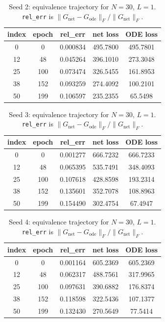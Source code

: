 \begin{table}[H]
\centering
\caption{Seed 2: equivalence trajectory for $N=30$, $L=1$. \texttt{rel\_err} is $\|G_{\mathrm{net}} - G_{\mathrm{ode}}\|_F / \|G_{\mathrm{net}}\|_F$.}
\label{tab:equiv-N30-L1-s2}
\begin{tabular}{c c c c c}
\toprule
index & epoch & rel\_err & net loss & ODE loss \\
\midrule
0 & 0 & 0.000834 & 495.7800 & 495.7801 \\
12 & 48 & 0.045264 & 396.1010 & 273.3048 \\
25 & 100 & 0.073474 & 326.5455 & 161.8953 \\
38 & 152 & 0.093259 & 274.4092 & 100.2101 \\
50 & 199 & 0.106597 & 235.2355 & 65.5498 \\
\bottomrule
\end{tabular}
\end{table}

\begin{table}[H]
\centering
\caption{Seed 3: equivalence trajectory for $N=30$, $L=1$. \texttt{rel\_err} is $\|G_{\mathrm{net}} - G_{\mathrm{ode}}\|_F / \|G_{\mathrm{net}}\|_F$.}
\label{tab:equiv-N30-L1-s3}
\begin{tabular}{c c c c c}
\toprule
index & epoch & rel\_err & net loss & ODE loss \\
\midrule
0 & 0 & 0.001277 & 666.7232 & 666.7233 \\
12 & 48 & 0.065395 & 535.7491 & 348.4093 \\
25 & 100 & 0.107618 & 428.8598 & 193.2314 \\
38 & 152 & 0.135601 & 352.7078 & 108.8963 \\
50 & 199 & 0.154490 & 302.4754 & 67.4947 \\
\bottomrule
\end{tabular}
\end{table}

\begin{table}[H]
\centering
\caption{Seed 4: equivalence trajectory for $N=30$, $L=1$. \texttt{rel\_err} is $\|G_{\mathrm{net}} - G_{\mathrm{ode}}\|_F / \|G_{\mathrm{net}}\|_F$.}
\label{tab:equiv-N30-L1-s4}
\begin{tabular}{c c c c c}
\toprule
index & epoch & rel\_err & net loss & ODE loss \\
\midrule
0 & 0 & 0.001164 & 605.2369 & 605.2369 \\
12 & 48 & 0.062317 & 488.7561 & 317.9965 \\
25 & 100 & 0.097631 & 390.6882 & 176.8374 \\
38 & 152 & 0.118598 & 322.5436 & 107.1377 \\
50 & 199 & 0.132430 & 270.5649 & 77.5414 \\
\bottomrule
\end{tabular}
\end{table}


